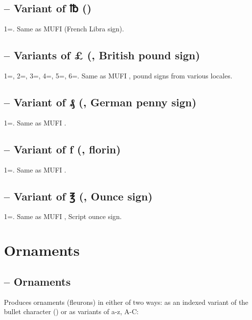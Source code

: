 \subsection{ – Variant of ℔ ()}
1=. Same as MUFI  (French Libra sign).

\subsection{ – Variants of {\pounds} (, British pound sign)}
1=, 2=, 3=, 4=,
5=, 6=. Same as MUFI , pound signs from various locales.

\subsection{ – Variant of ₰ (, German penny sign)}
1=. Same as MUFI .

\subsection{ – Variant of ƒ (, florin)}
1=. Same as MUFI .

\subsection{ – Variant of ℥ (, Ounce sign)}
1=. Same as MUFI , Script ounce sign.

\section{Ornaments}
\subsection{ – Ornaments}\hypertarget{ornm}{}
Produces ornaments (fleurons) in either of two ways: as an indexed variant of the bullet character () or as
variants of a-z, A-C:

